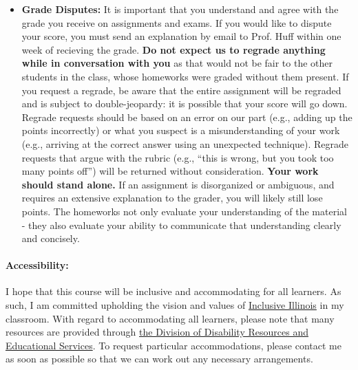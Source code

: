 \documentclass[11pt, a4paper]{article}
\begin{document}
\begin{itemize}
\item[] \textbf{Grade Disputes:} It is important that you understand and agree 
        with the grade you receive on assignments and exams. If you would like 
        to dispute your score, you must send an explanation by email to Prof. 
        Huff within one week of recieving the grade.  
        \textbf{Do not expect us to regrade anything while in conversation with 
        you} as that would not be fair to the other students in the class, whose 
        homeworks were graded without them present.  If you request a regrade, 
        be aware that the entire assignment will be regraded and is subject to 
        double-jeopardy: it is possible that your score will go down.
        Regrade requests should be based on an error on our part (e.g., adding 
        up the points incorrectly) or what you suspect is a misunderstanding of 
        your work (e.g., arriving at the correct answer using an unexpected 
        technique). Regrade requests that argue with the rubric (e.g., ``this is 
        wrong, but you took too many points off'') will be returned without 
        consideration. 
        \textbf{Your work should stand alone.} If an assignment is disorganized or 
        ambiguous, and requires an extensive explanation to the grader, you 
        will likely still lose points. The homeworks not only evaluate your 
        understanding of the material - they also evaluate your ability to 
        communicate that understanding clearly and concisely.
\end{itemize}

\paragraph{Accessibility:} I hope that this course will be inclusive and 
accommodating for all learners. As such, I am committed upholding the vision 
and values of \href{http://www.inclusiveillinois.illinois.edu/index.html}{Inclusive Illinois}
in my 
classroom.  With regard to accommodating all learners, please note that many 
resources are provided through 
\href{http://disability.illinois.edu/academic-support/accommodations}{the 
Division of Disability Resources and Educational Services}.  To request 
particular accommodations, please contact me as soon as possible so that we can 
work out any necessary arrangements.
\end{document}
